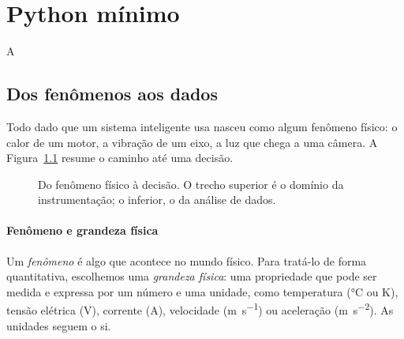 \chapter{Python mínimo}

A

\section{Dos fenômenos aos dados}

Todo dado que um sistema inteligente usa nasceu como algum fenômeno físico: o calor de um motor, a vibração de um eixo, a luz que chega a uma câmera. A Figura~\ref{fig:ciclo} resume o caminho até uma decisão.
 
\begin{figure}[htb]
\centering
{}
\caption{Do fenômeno físico à decisão. O trecho superior é o domínio da instrumentação; o inferior, o da análise de dados.}
\label{fig:ciclo}
\end{figure}
 
\subsubsection{Fenômeno e grandeza física}
 
Um \emph{fenômeno} é algo que acontece no mundo físico. Para tratá-lo de forma quantitativa, escolhemos uma \emph{grandeza física}: uma propriedade que pode ser medida e expressa por um número e uma unidade, como temperatura (\unit{\degreeCelsius} ou \unit{\kelvin}), tensão elétrica (\unit{\volt}), corrente (\unit{\ampere}), velocidade (\unit{\meter\per\second}) ou aceleração (\unit{\meter\per\second\squared}). As unidades seguem o \ac{si}.
 
